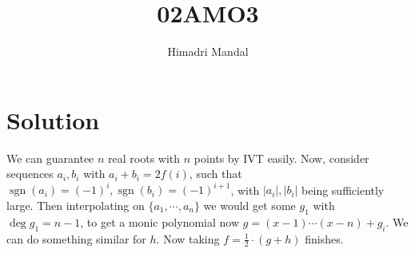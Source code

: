 \documentclass[11pt]{scrartcl}
\title{02AMO3}
\author{Himadri Mandal}
\begin{document}
\maketitle

\section{Solution}
\begin{soln}
  
We can guarantee $n$ real roots with $n$ points by IVT easily. Now, consider
sequences $a_i, b_i$ with $a_i + b_i = 2f(i)$, such that $\operatorname{sgn}(a_i) = (-1)^i, \operatorname{sgn}(b_i) = (-1)^{i+1}$, 
with $|a_i|, |b_i|$ being sufficiently large. Then interpolating on $\{a_1,\cdots,a_n\}$ we would get some $g_1$ with $\deg g_1= n-1$,
to get a monic polynomial now  
$g = (x-1)\cdots(x-n) + g_i$. We can do something similar for $h$.
Now taking $f = \frac12 \cdot (g + h)$ finishes.

\end{soln}
\end{document}
